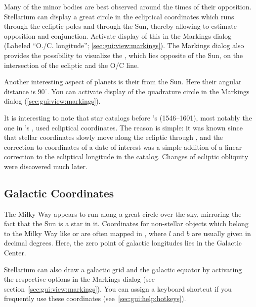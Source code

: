 Many of the minor bodies are best observed around the times of their
opposition.  Stellarium can display a great circle in the ecliptical
coordinates which runs through the ecliptic poles and through the Sun,
thereby allowing to estimate opposition and conjunction. Activate
display of this  in the Markings dialog
(Labeled ``O./C. longitude''; \ref{sec:gui:view:markings}). 
The Markings dialog also provides the possibility to visualize the ,
which lies opposite of the Sun, on the intersection of the ecliptic and the O/C line.

Another interesting aspect of planets is their 
from the Sun.  Here their angular distance is $90^\circ$.  You can
activate display of the quadrature circle in the Markings dialog
(\ref{sec:gui:view:markings}).

It is interesting to note that star catalogs before 's 
(1546--1601), most notably the one in 's
, used ecliptical coordinates. The reason is
simple: it was known since  that stellar coordinates
slowly move along the ecliptic through , and the
correction to coordinates of a date of interest was a simple addition
of a linear correction to the ecliptical longitude in the
catalog. Changes of ecliptic obliquity were discovered much later.

\subsection{Galactic Coordinates}
\label{sec:Concepts:Galactic}

The Milky Way appears to run along a great circle over the sky,
mirroring the fact that the Sun is a star in it. Coordinates for
non-stellar objects which belong to the Milky Way like
 or  are often mapped
in , 
where  $l$ and 
 $b$ are usually given in decimal
degrees. Here, the zero point of galactic longitudes lies in the
Galactic Center.

Stellarium can also draw a galactic grid and the galactic equator by
activating the respective options in the Markings dialog (see
section~\ref{sec:gui:view:markings}). You can assign a keyboard
shortcut if you frequently use these coordinates
(see~\ref{sec:gui:help:hotkeys}).


